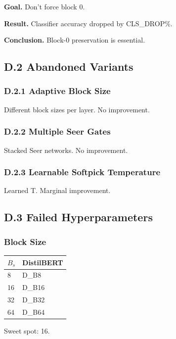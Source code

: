 \textbf{Goal.} Don't force block 0.

\textbf{Result.} Classifier accuracy dropped by {{CLS\_DROP}}\%.

\textbf{Conclusion.} Block-0 preservation is essential.

\subsection{D.2 Abandoned Variants}

\subsubsection{D.2.1 Adaptive Block Size}

Different block sizes per layer. No improvement.

\subsubsection{D.2.2 Multiple Seer Gates}

Stacked Seer networks. No improvement.

\subsubsection{D.2.3 Learnable Softpick Temperature}

Learned T. Marginal improvement.

\subsection{D.3 Failed Hyperparameters}

\subsubsection{Block Size}

\begin{table}[H]
\centering
\small
\begin{tabular}{ll}
\toprule
\textbf{$B_s$} & \textbf{DistilBERT} \\
\midrule
8 & {{D\_B8}} \\
16 & {{D\_B16}} \\
32 & {{D\_B32}} \\
64 & {{D\_B64}} \\
\bottomrule
\end{tabular}
\end{table}

Sweet spot: 16.

